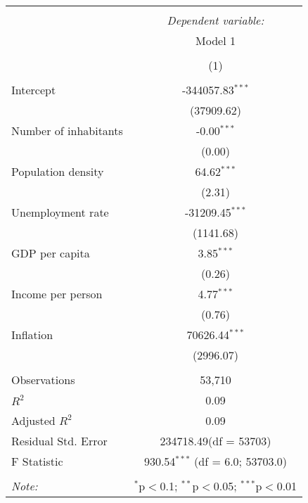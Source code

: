 \begin{table}[!htbp] \centering
\begin{tabular}{@{\extracolsep{5pt}}lc}
\\[-1.8ex]\hline
\hline \\[-1.8ex]
& \multicolumn{1}{c}{\textit{Dependent variable:}} \
\cr \cline{1-2}
\\[-1.8ex] & \multicolumn{1}{c}{Model 1} \\\\[-1.8ex] & (1) \\
\hline \\[-1.8ex]
 Intercept & -344057.83$^{***}$ \\
  & (37909.62) \\
 Number of inhabitants & -0.00$^{***}$ \\
  & (0.00) \\
 Population density & 64.62$^{***}$ \\
  & (2.31) \\
 Unemployment rate & -31209.45$^{***}$ \\
  & (1141.68) \\
 GDP per capita & 3.85$^{***}$ \\
  & (0.26) \\
 Income per person & 4.77$^{***}$ \\
  & (0.76) \\
 Inflation & 70626.44$^{***}$ \\
  & (2996.07) \\
\hline \\[-1.8ex]
 Observations & 53,710 \\
 $R^2$ & 0.09 \\
 Adjusted $R^2$ & 0.09 \\
 Residual Std. Error & 234718.49(df = 53703)  \\
 F Statistic & 930.54$^{***}$ (df = 6.0; 53703.0) \\
\hline
\hline \\[-1.8ex]
\textit{Note:} & \multicolumn{1}{r}{$^{*}$p$<$0.1; $^{**}$p$<$0.05; $^{***}$p$<$0.01} \\
\end{tabular}
\end{table}